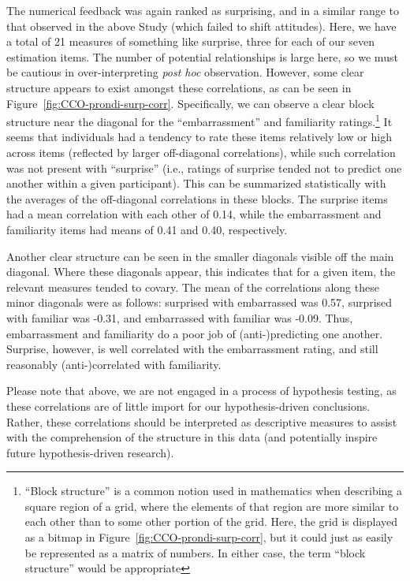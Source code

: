 The numerical feedback was again ranked as surprising, and in a similar range to
that observed in the above Study (which failed to shift attitudes). Here, we
have a total of 21 measures of something like surprise, three for each of our
seven estimation items.  The number of potential relationships is large here, so
we must be cautious in over-interpreting \emph{post hoc} observation. However,
some clear structure appears to exist amongst these correlations, as can be seen
in Figure~\ref{fig:CCO-prondi-surp-corr}. Specifically, we can observe a clear
block structure near the diagonal for the “embarrassment” and familiarity
ratings.\footnote{“Block structure” is a common notion used in mathematics when
    describing a square region of a grid, where the elements of that region are
    more similar to each other than to some other portion of the grid. Here, the
    grid is displayed as a bitmap in Figure~\ref{fig:CCO-prondi-surp-corr}, but
    it could just as easily be represented as a matrix of numbers. In either
    case, the term “block structure” would be appropriate} It seems that
individuals had a tendency to rate these items relatively low or high across
items (reflected by larger off-diagonal correlations), while such correlation
was not present with “surprise” (i.e., ratings of surprise tended not to predict
one another within a given participant). This can be summarized statistically with the
averages of the off-diagonal correlations in these blocks. The surprise items
had a mean correlation with each other of 0.14, while the embarrassment and
familiarity items had means of 0.41 and 0.40, respectively.

Another clear structure can be seen in the smaller diagonals visible off the
main diagonal.  Where these diagonals appear, this indicates that for a given
item, the relevant measures tended to covary. The mean of the correlations along
these minor diagonals were as follows: surprised with embarrassed was 0.57,
surprised with familiar was -0.31, and embarrassed with familiar was -0.09.
Thus, embarrassment and familiarity do a poor job of (anti-)predicting one another.
Surprise, however, is well correlated with the embarrassment rating, and still
reasonably (anti-)correlated with familiarity. 

Please note that above, we are not engaged in a process of hypothesis testing,
as these correlations are of little import for our hypothesis-driven
conclusions. Rather, these correlations should be interpreted as descriptive
measures to assist with the comprehension of the structure in this data (and
potentially inspire future hypothesis-driven research).

